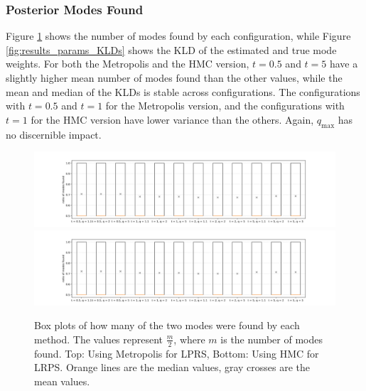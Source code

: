 \documentclass[12pt, a4paper]{report}
\begin{document}
\subsubsection{Posterior Modes Found}
Figure \ref{fig:results_params_modes_found} shows the number of modes found by each configuration, while Figure \ref{fig:results_params_KLDs} shows the KLD of the estimated and true mode weights.
For both the Metropolis and the HMC version, $t=0.5$ and $t=5$ have a slightly higher mean number of modes found than the other values, while the mean and median of the KLDs is stable across configurations.
The configurations with $t=0.5$ and $t=1$ for the Metropolis version, and the configurations with $t=1$ for the HMC version have lower variance than the others.
Again, $q_{\textrm{max}}$ has no discernible impact.
\begin{figure}
    \centering
    \includegraphics[trim={3cm 0cm 3cm 0cm}, clip, width=\textwidth]{figs/results/params/modes_found_metropolis.png}
    \includegraphics[trim={3cm 0cm 3cm 0cm}, clip, width=\textwidth]{figs/results/params/modes_found_hmc.png}
    \caption{Box plots of how many of the two modes were found by each method. The values represent $\frac{m}{2}$, where $m$ is the number of modes found. Top: Using Metropolis for LPRS, Bottom: Using HMC for LRPS. Orange lines are the median values, gray crosses are the mean values.}
    \label{fig:results_params_modes_found}
\end{figure}
\end{document}
